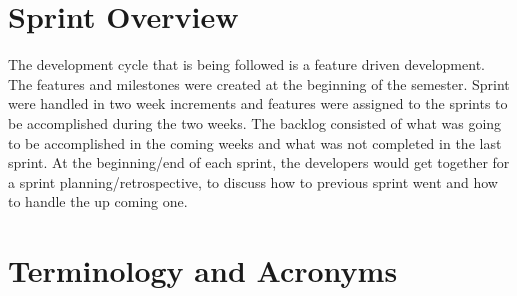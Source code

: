 \section{Sprint  Overview}
The development cycle that is being followed is a feature driven development.
The features and milestones were created at the beginning of the semester.
Sprint were handled in two week increments and features were assigned to 
the sprints to be accomplished during the two weeks. The backlog consisted
of what was going to be accomplished in the coming weeks and what was not
completed in the last sprint. At the beginning/end of each sprint, the 
developers would get together for a sprint planning/retrospective, to discuss
how to previous sprint went and how to handle the up coming one.


\section{Terminology and Acronyms}

